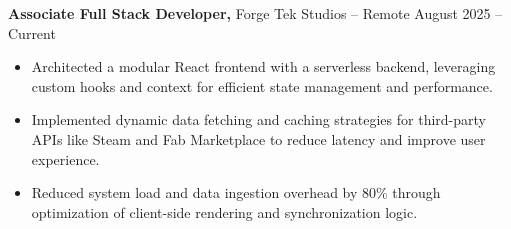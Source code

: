 \documentclass[11pt]{article}       %
\begin{document}
\textbf{Associate Full Stack Developer,} {Forge Tek Studios} -- Remote \hfill August 2025 -- Current 
\vspace{-9pt}
\begin{itemize}
  \item Architected a modular React frontend with a serverless backend, leveraging custom hooks and context for efficient state management and performance.
  \item Implemented dynamic data fetching and caching strategies for third-party APIs like Steam and Fab Marketplace to reduce latency and improve user experience.
  \item Reduced system load and data ingestion overhead by 80\% through optimization of client-side rendering and synchronization logic.
\end{itemize}

\end{document}
